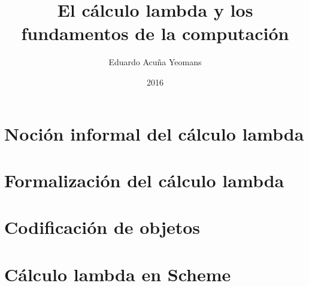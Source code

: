 \documentclass[letterpaper,twoside,openright,11pt]{book}
\theoremstyle{indented}
\begin{document}
\title{El cálculo lambda y los fundamentos de la computación}
\author{Eduardo Acuña Yeomans}
\date{2016}

\maketitle

\frontmatter
\tableofcontents

\mainmatter
\chapter{Noción informal del cálculo lambda}
\label{ch:nocion-informal}


\chapter{Formalización del cálculo lambda}
\label{ch:formalizacion}


\chapter{Codificación de objetos}
\label{ch:codificacion}


\appendix

\chapter{Cálculo lambda en Scheme}
\label{ap:lambda-scheme}


\nocite{*}


\end{document}
